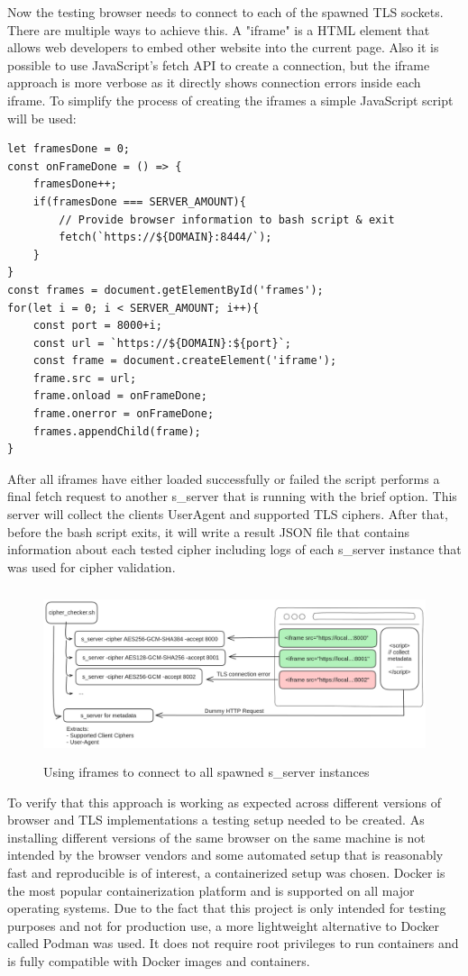 \documentclass[12pt]{scrbook}
\begin{document}
Now the testing browser needs to connect to each of the spawned TLS sockets.
There are multiple ways to achieve this.
A "iframe" is a HTML element that allows web developers to embed other website
into the current page. Also it is possible
to use JavaScript's fetch API to create a connection, but the iframe approach is
more verbose as it directly shows
connection errors inside each iframe. To simplify the process of creating the
iframes a simple JavaScript script will be used:

\begin{verbatim}
let framesDone = 0;
const onFrameDone = () => {
    framesDone++;
    if(framesDone === SERVER_AMOUNT){
        // Provide browser information to bash script & exit
        fetch(`https://${DOMAIN}:8444/`);
    }
}
const frames = document.getElementById('frames');
for(let i = 0; i < SERVER_AMOUNT; i++){
    const port = 8000+i;
    const url = `https://${DOMAIN}:${port}`;
    const frame = document.createElement('iframe');
    frame.src = url;
    frame.onload = onFrameDone;
    frame.onerror = onFrameDone;
    frames.appendChild(frame);
}
\end{verbatim}

After all iframes have either loaded successfully or failed the script performs
a final fetch request to another
s\_server that is running with the \-brief option. This server will collect the
clients User\-Agent and supported TLS ciphers.
After that, before the bash script exits, it will write a result JSON file that
contains information about each tested cipher including logs
of each s\_server instance that was used for cipher validation.

\begin{figure}
	\centering
	\includegraphics[height=5cm]{./images/cipher_check_setup.png}
	\caption{Using iframes to connect to all spawned s\_server instances}
\end{figure}

\newpage

To verify that this approach is working as expected across different versions of
browser
and TLS implementations a testing setup needed to be created.
As installing different versions of the same browser on the same machine is not
intended by the browser vendors and
some automated setup that is reasonably fast and reproducible is of interest, a
containerized setup was chosen.
Docker is the most popular containerization platform and is supported on all
major operating systems.
Due to the fact that this project is only intended for testing purposes and not
for production use, a more lightweight alternative
to Docker called Podman was used. It does not require root privileges to run
containers and is fully compatible with Docker images and containers.
\end{document}
